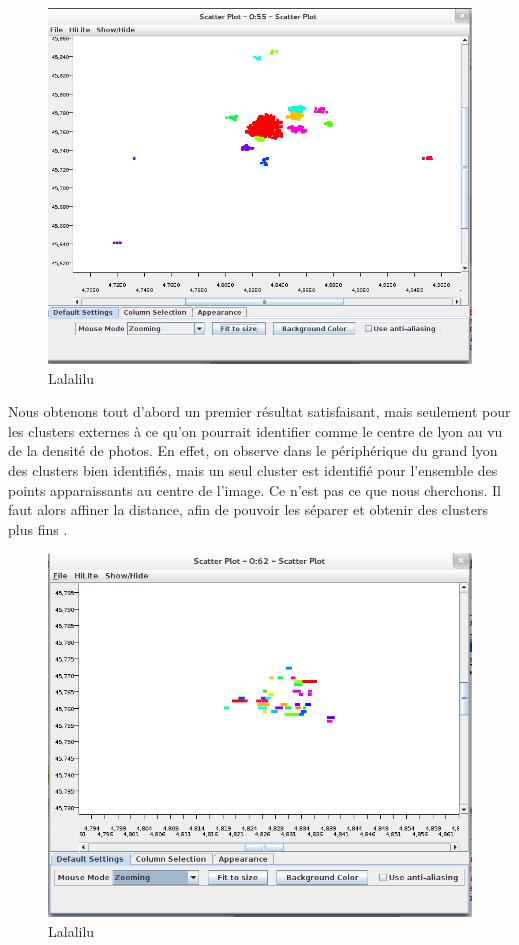 \begin{figure}[H]
    \centering
    \includegraphics[width=\linewidth]{img/dbscan_50.png}
    \caption{Lalalilu}
\end{figure}

Nous obtenons tout d'abord un premier résultat satisfaisant, mais seulement pour les clusters externes à ce qu'on pourrait identifier comme le centre de lyon au vu de la densité de photos. En effet, on observe dans le périphérique du grand lyon des clusters bien identifiés, mais un seul cluster est identifié pour l'ensemble des points apparaissants au centre de l'image. Ce n'est pas ce que nous cherchons. Il faut alors affiner la distance, afin de pouvoir les séparer et obtenir des clusters plus fins .

\begin{figure}[H]
    \centering
    \includegraphics[width=\linewidth]{img/dbscan_21.png}
    \caption{Lalalilu}
\end{figure}


